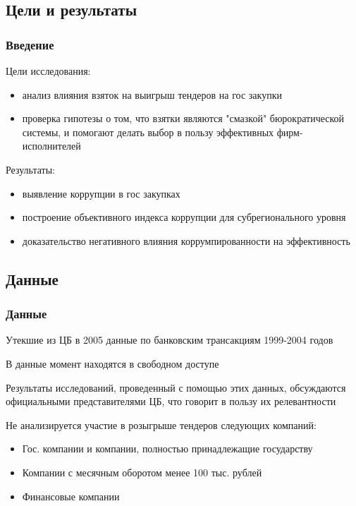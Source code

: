 \subsection{Цели и результаты}

\begin{frame}

\frametitle{Введение}
Цели исследования:\\ 

\begin{itemize}
\item анализ влияния взяток на выигрыш 
тендеров на гос закупки

\item проверка гипотезы о том, 
что взятки являются "смазкой" бюрократической системы, и помогают делать выбор в пользу
эффективных фирм-исполнителей
\end{itemize}

\vspace{5mm}

Результаты:
\begin{itemize}

\item выявление коррупции в гос закупках

\item построение объективного индекса
коррупции для субрегионального уровня

\item доказательство негативного влияния коррумпированности на
эффективность

\end{itemize}

\end{frame}



\subsection{Данные}

\begin{frame}

\frametitle{Данные}
Утекшие из ЦБ в 2005 данные по банковским трансакциям 1999-2004 годов
\vspace{3mm}

В данные момент находятся в свободном доступе
\vspace{3mm}

Результаты исследований, проведенный с помощью этих данных, 
обсуждаются официальными представителями ЦБ,
что говорит в пользу их релевантности
\vspace{3mm}

Не анализируется участие в розыгрыше тендеров следующих компаний:
\begin{itemize}
\item Гос. компании и компании, полностью принадлежащие государству
\item Компании с месячным оборотом менее 100 тыс. рублей
\item Финансовые компании
\end{itemize}

\end{frame}